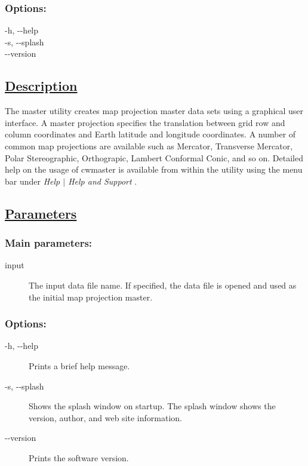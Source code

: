 \subsubsection*{Options:}


  -h, -{-}help \\ 
 -s, -{-}splash \\ 
 -{-}version \\ 

\subsection*{\underline{Description}}


  The master utility creates map projection master data sets using a graphical user interface. A master projection specifies the translation between grid row and column coordinates and Earth latitude and longitude coordinates. A number of common map projections are available such as Mercator, Transverse Mercator, Polar Stereographic, Orthograpic, Lambert Conformal Conic, and so on. Detailed help on the usage of cwmaster is available from within the utility using the menu bar under \emph{Help $|$ Help and Support}
.
\subsection*{\underline{Parameters}}
\subsubsection*{Main parameters:}
\begin{description}
\item[input]The input data file name. If specified, the data file is opened and used as the initial map projection master.

\end{description}
\subsubsection*{Options:}
\begin{description}
\item[-h, -{-}help]Prints a brief help message.
\item[-s, -{-}splash]Shows the splash window on startup. The splash window shows the version, author, and web site information.
\item[-{-}version]Prints the software version.

\end{description}
